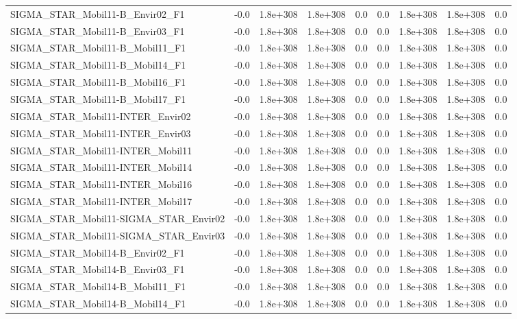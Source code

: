 \begin{tabular}{lrrrrrrrr}
SIGMA_STAR_Mobil11-B_Envir02_F1 & -0.0 & 1.8e+308 & 1.8e+308 & 0.0 & 0.0 & 1.8e+308 & 1.8e+308 & 0.0 \\
SIGMA_STAR_Mobil11-B_Envir03_F1 & -0.0 & 1.8e+308 & 1.8e+308 & 0.0 & 0.0 & 1.8e+308 & 1.8e+308 & 0.0 \\
SIGMA_STAR_Mobil11-B_Mobil11_F1 & -0.0 & 1.8e+308 & 1.8e+308 & 0.0 & 0.0 & 1.8e+308 & 1.8e+308 & 0.0 \\
SIGMA_STAR_Mobil11-B_Mobil14_F1 & -0.0 & 1.8e+308 & 1.8e+308 & 0.0 & 0.0 & 1.8e+308 & 1.8e+308 & 0.0 \\
SIGMA_STAR_Mobil11-B_Mobil16_F1 & -0.0 & 1.8e+308 & 1.8e+308 & 0.0 & 0.0 & 1.8e+308 & 1.8e+308 & 0.0 \\
SIGMA_STAR_Mobil11-B_Mobil17_F1 & -0.0 & 1.8e+308 & 1.8e+308 & 0.0 & 0.0 & 1.8e+308 & 1.8e+308 & 0.0 \\
SIGMA_STAR_Mobil11-INTER_Envir02 & -0.0 & 1.8e+308 & 1.8e+308 & 0.0 & 0.0 & 1.8e+308 & 1.8e+308 & 0.0 \\
SIGMA_STAR_Mobil11-INTER_Envir03 & -0.0 & 1.8e+308 & 1.8e+308 & 0.0 & 0.0 & 1.8e+308 & 1.8e+308 & 0.0 \\
SIGMA_STAR_Mobil11-INTER_Mobil11 & -0.0 & 1.8e+308 & 1.8e+308 & 0.0 & 0.0 & 1.8e+308 & 1.8e+308 & 0.0 \\
SIGMA_STAR_Mobil11-INTER_Mobil14 & -0.0 & 1.8e+308 & 1.8e+308 & 0.0 & 0.0 & 1.8e+308 & 1.8e+308 & 0.0 \\
SIGMA_STAR_Mobil11-INTER_Mobil16 & -0.0 & 1.8e+308 & 1.8e+308 & 0.0 & 0.0 & 1.8e+308 & 1.8e+308 & 0.0 \\
SIGMA_STAR_Mobil11-INTER_Mobil17 & -0.0 & 1.8e+308 & 1.8e+308 & 0.0 & 0.0 & 1.8e+308 & 1.8e+308 & 0.0 \\
SIGMA_STAR_Mobil11-SIGMA_STAR_Envir02 & -0.0 & 1.8e+308 & 1.8e+308 & 0.0 & 0.0 & 1.8e+308 & 1.8e+308 & 0.0 \\
SIGMA_STAR_Mobil11-SIGMA_STAR_Envir03 & -0.0 & 1.8e+308 & 1.8e+308 & 0.0 & 0.0 & 1.8e+308 & 1.8e+308 & 0.0 \\
SIGMA_STAR_Mobil14-B_Envir02_F1 & -0.0 & 1.8e+308 & 1.8e+308 & 0.0 & 0.0 & 1.8e+308 & 1.8e+308 & 0.0 \\
SIGMA_STAR_Mobil14-B_Envir03_F1 & -0.0 & 1.8e+308 & 1.8e+308 & 0.0 & 0.0 & 1.8e+308 & 1.8e+308 & 0.0 \\
SIGMA_STAR_Mobil14-B_Mobil11_F1 & -0.0 & 1.8e+308 & 1.8e+308 & 0.0 & 0.0 & 1.8e+308 & 1.8e+308 & 0.0 \\
SIGMA_STAR_Mobil14-B_Mobil14_F1 & -0.0 & 1.8e+308 & 1.8e+308 & 0.0 & 0.0 & 1.8e+308 & 1.8e+308 & 0.0 \\

\end{tabular}
